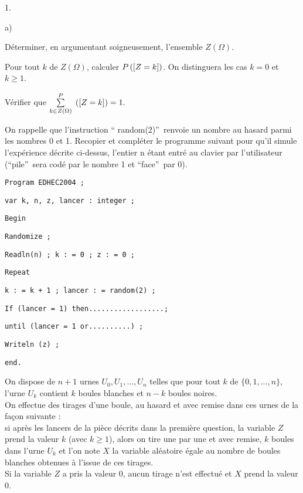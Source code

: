 \documentclass[11pt]{article}%
\begin{document}
\begin{noliste}{1.}
 \setlength{\itemsep}{4mm}
\item 

\begin{noliste}{a)}
 \setlength{\itemsep}{2mm}
\item Déterminer, en argumentant soigneusement, l'ensemble $Z(\Omega
)$.

\item Pour tout $k$ de $Z(\Omega )$, calculer $P\left(\left[ {Z =
k} \right]\right)$. On distinguera les
cas $k = 0$ et $k\geq 1$.

\item Vérifier que ${\textstyle\sum\limits_{k\in Z(\Omega )}^{P}}\hspace{.1cm}\left(\left[ {Z = k} \right]\right) = 1.$

\item On rappelle que l'instruction \textquotedblleft
random(2)\textquotedblright\ renvoie un nombre au hasard parmi les
nombres 0
et 1. Recopier et compléter le programme suivant pour qu'il simule \\
l'expérience décrite ci-dessus, l'entier n étant entré au clavier par
l'utilisateur (\textquotedblleft pile\textquotedblright\ sera codé par
le
nombre 1 et \textquotedblleft face\textquotedblright\ par 0).

\texttt{Program EDHEC2004 ;}

\texttt{var k, n, z, lancer : integer ;}

\texttt{Begin}

\texttt{Randomize ;}

\texttt{Readln(n) ; k : = 0 ; z : = 0 ;}

\texttt{Repeat }

\texttt{k : = k + 1 ; lancer : = random(2) ; }

\texttt{If (lancer = 1) then..................;}

\texttt{until (lancer = 1 or..........) ;}

\texttt{Writeln (z) ; }

\texttt{end.}

\noindent On dispose de $n + 1$ urnes $U_{0},U_{1},...,U_{n}$ telles
que pour
tout $k$ de $\{0,1,...,n\}$, l'urne $U_{k}$ contient $k$ boules
blanches et $
n-k$ boules noires.\\
On effectue des tirages d'une boule, au hasard et avec remise dans ces
urnes
de la façon suivante : \\
si après les lancers de la pièce décrits dans la première question, la
variable $Z$ prend la valeur $k$ (avec $k\geq 1$), alors on tire une
par une et avec remise, $k$ boules dans l'urne $U_{k}$ et l'on note $X$
la
variable aléatoire égale au nombre de boules blanches obtenues à
l'issue de
ces tirages. \\
Si la variable $Z$ a pris la valeur 0, aucun tirage n'est effectué et
$X$
prend la valeur 0.
\end{noliste}


\end{noliste}
\end{document}
